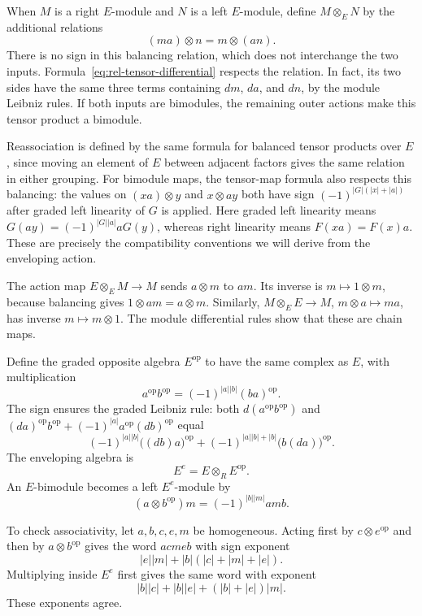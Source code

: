 When $M$ is a right $E$-module and $N$ is a left $E$-module, define
$M\otimes_E N$ by the additional relations
\[
 (ma)\otimes n=m\otimes(an).
\]
There is no sign in this balancing relation, which does not interchange
the two inputs. Formula~\eqref{eq:rel-tensor-differential} respects the
relation. In fact, its two sides have the same three terms containing
$dm$, $da$, and $dn$, by the module Leibniz rules.
If both inputs are bimodules, the remaining outer actions make this tensor
product a bimodule.

Reassociation is defined by the same formula for balanced tensor products
over $E$, since moving an element of $E$ between adjacent factors gives
the same relation in either grouping.
For bimodule maps, the tensor-map formula also respects this balancing:
the values on $(xa)\otimes y$ and $x\otimes ay$ both have sign
$(-1)^{|G|(|x|+|a|)}$ after graded left linearity of $G$ is applied.
Here graded left linearity means
$G(ay)=(-1)^{|G||a|}aG(y)$, whereas right linearity means
$F(xa)=F(x)a$. These are precisely the compatibility conventions we will
derive from the enveloping action.

The action map $E\otimes_E M\to M$ sends $a\otimes m$ to $am$.
Its inverse is $m\mapsto1\otimes m$, because balancing gives
$1\otimes am=a\otimes m$.
Similarly, $M\otimes_E E\to M$, $m\otimes a\mapsto ma$, has inverse
$m\mapsto m\otimes1$.
The module differential rules show that these are chain maps.

Define the graded opposite algebra $E^{\mathrm{op}}$ to have the same
complex as $E$, with multiplication
\[
 a^{\mathrm{op}}b^{\mathrm{op}}
   =(-1)^{|a||b|}(ba)^{\mathrm{op}}.
\]
The sign ensures the graded Leibniz rule: both
$d(a^{\mathrm{op}}b^{\mathrm{op}})$ and
$(da)^{\mathrm{op}}b^{\mathrm{op}}
 +(-1)^{|a|}a^{\mathrm{op}}(db)^{\mathrm{op}}$ equal
\[
 (-1)^{|a||b|}\bigl((db)a\bigr)^{\mathrm{op}}
 +(-1)^{|a||b|+|b|}\bigl(b(da)\bigr)^{\mathrm{op}}.
\]
The enveloping algebra is
\[
 E^e=E\otimes_R E^{\mathrm{op}}.
\]
An $E$-bimodule becomes a left $E^e$-module by
\begin{equation}\label{eq:rel-envelope-action}
 (a\otimes b^{\mathrm{op}})m=(-1)^{|b||m|}amb.
\end{equation}

To check associativity, let $a,b,c,e,m$ be homogeneous.
Acting first by $c\otimes e^{\mathrm{op}}$ and then by
$a\otimes b^{\mathrm{op}}$ gives the word $acmeb$ with sign exponent
\[
 |e||m|+|b|(|c|+|m|+|e|).
\]
Multiplying inside $E^e$ first gives the same word with exponent
\[
 |b||c|+|b||e|+(|b|+|e|)|m|.
\]
These exponents agree.

